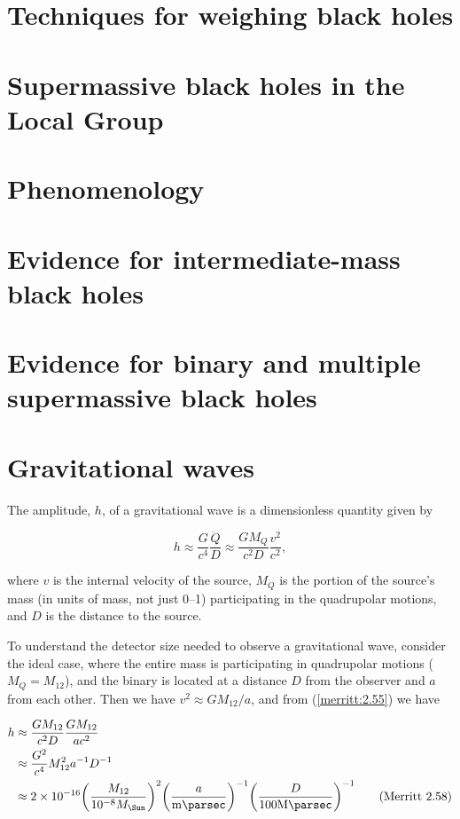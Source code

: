 \documentclass[degn-notes.tex]{subfiles}
\begin{document}
\section{Techniques for weighing black holes}

\section{Supermassive black holes in the Local Group}

\section{Phenomenology}

\section{Evidence for intermediate-mass black holes}

\section{Evidence for binary and multiple supermassive black holes}

\section{Gravitational waves}

The amplitude, $h$, of a gravitational wave is a dimensionless quantity given by

\begin{displaymath}
  h \approx
  \frac{G}{c^4} \frac{\ddot{Q}}{D} \approx
  \frac{G M_Q}{c^2 D} \frac{v^2}{c^2},
%
  \tag{Merritt 2.55}
  \label{merritt:2.55}
\end{displaymath}

where $v$ is the internal velocity of the source, $M_Q$ is the portion of the source's mass (in units of mass, not just 0--1) participating in the quadrupolar motions, and $D$ is the distance to the source.

To understand the detector size needed to observe a gravitational wave, consider the ideal case, where the entire mass is participating in quadrupolar motions ($M_Q = M_{12}$), and the binary is located at a distance $D$ from the observer and $a$ from each other. Then we have $v^2 \approx G M_{12} / a$, and from (\ref{merritt:2.55}) we have

\begin{align*}
  h &\approx
  \frac{G M_{12}}{c^2 D} \frac{G M_{12}}{a c^2}
  \\ &\approx
  \frac{G^2}{c^4} M_{12}^2 a^{-1} D^{-1}
  \\ &\approx
  \num{2e-16}
    \qty(\frac{M_{12}}{10^{-8} M_{\Sun}})^2
    \qty(\frac{a}{\si{\milli\parsec}})^{-1}
    \qty(\frac{D}{100\si{\mega\parsec}})^{-1}
%
  \tag{Merritt 2.58}
  \label{merritt:2.58}
\end{align*}
\end{document}
